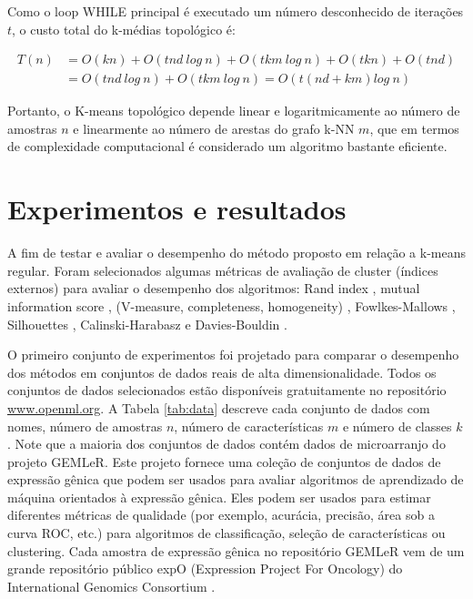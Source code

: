 \documentclass[sn-mathphys,Numbered]{sn-jnl}%
\theoremstyle{thmstyleone}%
\theoremstyle{thmstyletwo}%
\theoremstyle{thmstylethree}%
\begin{document}
Como o loop WHILE principal é executado um número desconhecido de iterações $t$, o custo total do k-médias topológico é:

\begin{align}
	T(n) & = O(kn) + O(tnd~log~n) + O(tkm~log~n) + O(tkn) + O(tnd) \\ \nonumber
	     & = O(tnd~log~n) + O(tkm~log~n) = O(t(nd+km)log~n)
\end{align}

Portanto, o K-means topológico depende linear e logaritmicamente ao número de amostras $n$ e linearmente ao número de arestas do grafo k-NN $m$, que em termos de complexidade computacional é considerado um algoritmo bastante eficiente.

\section{Experimentos e resultados}

A fim de testar e avaliar o desempenho do método proposto em relação a k-means regular. Foram selecionados algumas métricas de avaliação de cluster (índices externos) para avaliar o desempenho dos algoritmos:  Rand index \cite{Rand1,Rand2}, mutual information score \cite{Mutual}, (V-measure, completeness, homogeneity) \cite{Vmeasure}, Fowlkes-Mallows \cite{Fowlkes}, Silhouettes \cite{Silhouettes}, Calinski-Harabasz \cite{Calinski} e Davies-Bouldin \cite{Davies}.

O primeiro conjunto de experimentos foi projetado para comparar o desempenho dos métodos em conjuntos de dados reais de alta dimensionalidade. Todos os conjuntos de dados selecionados estão disponíveis gratuitamente no repositório \url{www.openml.org}. A Tabela \ref{tab:data} descreve cada conjunto de dados com nomes, número de amostras $n$, número de características $m$ e número de classes $k$. Note que a maioria dos conjuntos de dados contém dados de microarranjo do projeto GEMLeR. Este projeto fornece uma coleção de conjuntos de dados de expressão gênica que podem ser usados para avaliar algoritmos de aprendizado de máquina orientados à expressão gênica. Eles podem ser usados para estimar diferentes métricas de qualidade (por exemplo, acurácia, precisão, área sob a curva ROC, etc.) para algoritmos de classificação, seleção de características ou clustering. Cada amostra de expressão gênica no repositório GEMLeR vem de um grande repositório público expO (Expression Project For Oncology) do International Genomics Consortium \cite{GEMLeR}.
\end{document}
